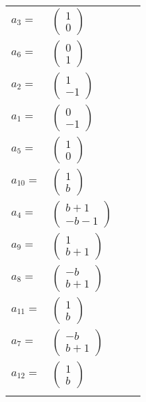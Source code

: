 \documentclass[1p]{elsarticle_modified}
\theoremstyle{definition}
\begin{document}
\begin{tabular}{m{7pt} m{180pt} m{7pt} m{180pt} }
\flushright $a_{3}=$&$\begin{pmatrix}1\\0\end{pmatrix}$ \\
\flushright $a_{6}=$&$\begin{pmatrix}0\\1\end{pmatrix}$ \\
\flushright $a_{2}=$&$\begin{pmatrix}1\\-1\end{pmatrix}$ \\
\flushright $a_{1}=$&$\begin{pmatrix}0\\-1\end{pmatrix}$ \\
\flushright $a_{5}=$&$\begin{pmatrix}1\\0\end{pmatrix}$ \\
\flushright $a_{10}=$&$\begin{pmatrix}1\\b\end{pmatrix}$ \\
\flushright $a_{4}=$&$\begin{pmatrix}b+1\\- b-1\end{pmatrix}$ \\
\flushright $a_{9}=$&$\begin{pmatrix}1\\b+1\end{pmatrix}$ \\
\flushright $a_{8}=$&$\begin{pmatrix}- b\\b+1\end{pmatrix}$ \\
\flushright $a_{11}=$&$\begin{pmatrix}1\\b\end{pmatrix}$ \\
\flushright $a_{7}=$&$\begin{pmatrix}- b\\b+1\end{pmatrix}$ \\
\flushright $a_{12}=$&$\begin{pmatrix}1\\b\end{pmatrix}$\\&\end{tabular}
\end{document}
